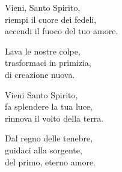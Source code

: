 

\spazio

\strofa Vieni, Santo Spirito,\\
riempi il cuore dei fedeli,\\
accendi il fuoco del tuo amore.

\spazio

\strofa Lava le nostre colpe,\\
trasformaci in primizia,\\
di creazione nuova.

\spazio


\spazio

\strofa Vieni Santo Spirito,\\
fa splendere la tua luce,\\
rinnova il volto della terra.

\spazio

\strofa Dal regno delle tenebre,\\
guidaci alla sorgente,\\
del primo, eterno amore.

\spazio

